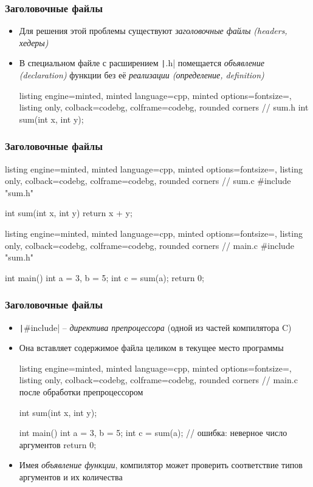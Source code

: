 \documentclass[10pt]{beamer}
\begin{document}
\begin{frame}[fragile]
\frametitle{Заголовочные файлы}
\begin{itemize}
\item Для решения этой проблемы существуют \textit{заголовочные файлы (headers, хедеры)}
\pause
\item В специальном файле с расширением \texttt|.h| помещается \textit{объявление (declaration)} функции без её \textit{реализации (определение, definition)}
\begin{tcblisting}{listing engine=minted, minted language=cpp, minted options={fontsize=\scriptsize}, listing only, colback=codebg, colframe=codebg, rounded corners}
// sum.h
int sum(int x, int y);
\end{tcblisting}
\end{itemize}
\end{frame}

\begin{frame}[fragile]
\frametitle{Заголовочные файлы}
\begin{itemize}
\begin{tcblisting}{listing engine=minted, minted language=cpp, minted options={fontsize=\scriptsize}, listing only, colback=codebg, colframe=codebg, rounded corners}
// sum.c
#include "sum.h"

int sum(int x, int y) {
  return x + y;
}
\end{tcblisting}
\begin{tcblisting}{listing engine=minted, minted language=cpp, minted options={fontsize=\scriptsize}, listing only, colback=codebg, colframe=codebg, rounded corners}
// main.c
#include "sum.h"

int main() {
  int a = 3, b = 5;
  int c = sum(a);
  return 0;
}
\end{tcblisting}
\end{itemize}
\end{frame}

\begin{frame}[fragile]
\frametitle{Заголовочные файлы}
\begin{itemize}
\item \texttt|#include| -- \textit{директива препроцессора} (одной из частей компилятора C)
\pause
\item Она вставляет содержимое файла целиком в текущее место программы
\begin{tcblisting}{listing engine=minted, minted language=cpp, minted options={fontsize=\scriptsize}, listing only, colback=codebg, colframe=codebg, rounded corners}
// main.c после обработки препроцессором

int sum(int x, int y);

int main() {
  int a = 3, b = 5;
  int c = sum(a); // ошибка: неверное число аргументов
  return 0;
}
\end{tcblisting}
\pause
\item Имея \textit{объявление функции}, компилятор может проверить соответствие типов аргументов и их количества
\end{itemize}
\end{frame}
\end{document}
